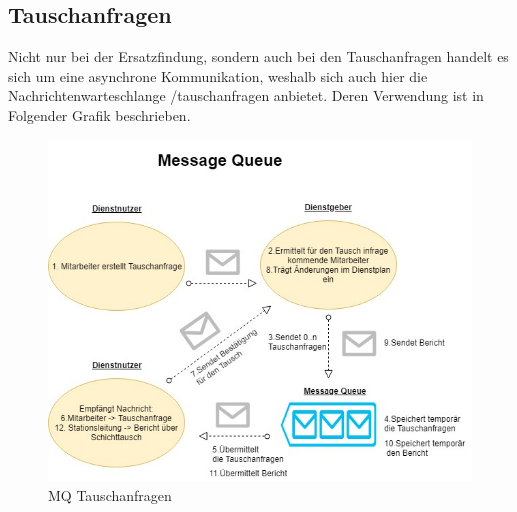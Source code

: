 \documentclass[11pt,
paper=a4,
bibtotocnumbered,	  %
liststotocnumbered,  %
DIV=calc,		  %
tablecaptionabove,	  %
headinclude,
]{article}
\begin{document}
\subsection{Tauschanfragen}
Nicht nur bei der Ersatzfindung, sondern auch bei den Tauschanfragen handelt es sich um eine asynchrone Kommunikation, weshalb sich auch hier die Nachrichtenwarteschlange /tauschanfragen anbietet. Deren Verwendung ist in Folgender Grafik beschrieben.
\begin{figure}[H]
\includegraphics[width=1\textwidth]{Bilder/mq2.jpg}
\caption{MQ Tauschanfragen}
\end{figure}
\end{document}
